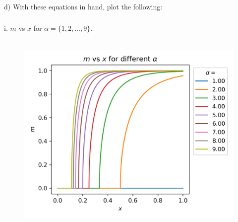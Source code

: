 \documentclass[12pt]{article}
\begin{document}
\subsection{}
d) With these equations in hand, plot the following:\\
\subsubsection{}

i. $m$ vs $x$ for $\alpha=\{1,2, \ldots, 9\}$.\\\\

\begin{figure}
  \centering
  \includegraphics[max width=\textwidth]{m-x.png}
\end{figure}
\end{document}
